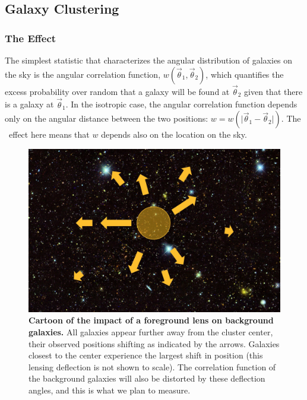 \subsection{Galaxy Clustering}\label{sec:lia}


\subsubsection{The Effect}
The simplest statistic that
characterizes the angular distribution of galaxies on the sky is the
angular correlation function, $w(\vec\theta_1,\vec\theta_2)$, which
quantifies the excess probability over random that a galaxy will be
found at $\vec\theta_2$ given that there is a galaxy at
$\vec\theta_1$. In the isotropic case, the angular correlation function depends only on the angular distance
between the two positions: $w=w(\vert\vec\theta_1-\vec\theta_2\vert)$. The \atf\ effect here means
that $w$ depends also on the location on the sky.

\begin{figure}
  \begin{center}
    \includegraphics[scale=0.33]{figs/clusterfig.jpg}
  \end{center}
  \caption{
{\bf Cartoon of the impact of a foreground lens on
  background galaxies.} All galaxies appear further away from the
  cluster center, their observed positions shifting as
  indicated by the arrows. Galaxies closest to the center experience
  the largest shift in position (this 
lensing deflection is not shown to scale). The correlation function
of the background galaxies will also be distorted by these deflection
angles, and this is what we plan to measure.}
  \label{cluster}
\end{figure}

